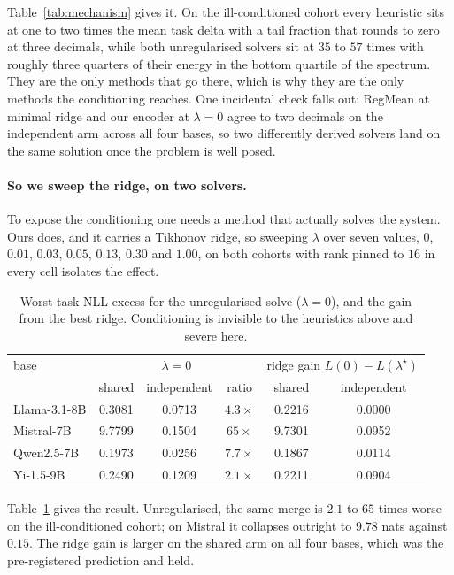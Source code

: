 Table~\ref{tab:mechanism} gives it. On the ill-conditioned cohort every
heuristic sits at one to two times the mean task delta with a tail
fraction that rounds to zero at three decimals, while both unregularised
solvers sit at $35$ to $57$ times with roughly three quarters of their
energy in the bottom quartile of the spectrum. They are the only methods
that go there, which is why they are the only methods the conditioning
reaches. One incidental check falls out: RegMean at minimal ridge and our
encoder at $\lambda = 0$ agree to two decimals on the independent arm
across all four bases, so two differently derived solvers land on the same
solution once the problem is well posed.

\paragraph{So we sweep the ridge, on two solvers.} To expose the
conditioning one needs a method that actually solves the system. Ours
does, and it carries a Tikhonov ridge, so sweeping $\lambda$ over seven
values, $0$, $0.01$, $0.03$, $0.05$, $0.13$, $0.30$ and $1.00$, on both
cohorts with rank pinned to $16$ in every cell isolates the effect.

\begin{table}[t]
\centering
\small
\caption{Worst-task NLL excess for the unregularised solve
($\lambda = 0$), and the gain from the best ridge. Conditioning is
invisible to the heuristics above and severe here.}
\label{tab:ridge}
\begin{tabular}{lccccc}
\toprule
base & \multicolumn{3}{c}{$\lambda = 0$} &
\multicolumn{2}{c}{ridge gain $L(0) - L(\lambda^\star)$} \\
 & shared & independent & ratio & shared & independent \\
\midrule
Llama-3.1-8B & 0.3081 & 0.0713 & $4.3\times$  & 0.2216 & 0.0000 \\
Mistral-7B   & 9.7799 & 0.1504 & $65\times$   & 9.7301 & 0.0952 \\
Qwen2.5-7B   & 0.1973 & 0.0256 & $7.7\times$  & 0.1867 & 0.0114 \\
Yi-1.5-9B    & 0.2490 & 0.1209 & $2.1\times$  & 0.2211 & 0.0904 \\
\bottomrule
\end{tabular}
\end{table}

Table~\ref{tab:ridge} gives the result. Unregularised, the same merge is
$2.1$ to $65$ times worse on the ill-conditioned cohort; on Mistral it
collapses outright to $9.78$ nats against $0.15$. The ridge gain is larger
on the shared arm on all four bases, which was the pre-registered
prediction and held.

